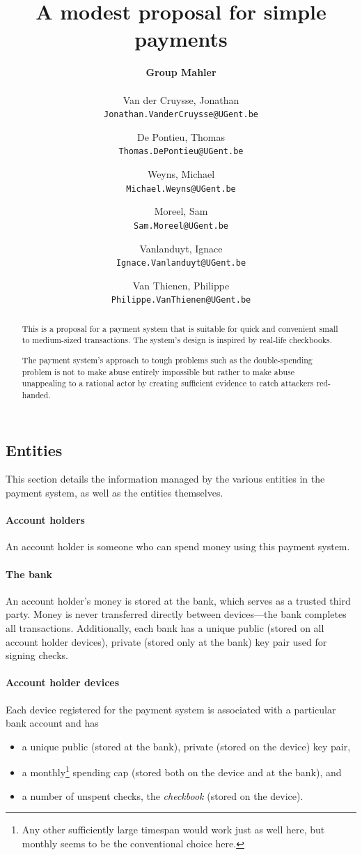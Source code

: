 \documentclass[12pt,a4paper]{article}
\author{
\textbf{Group Mahler}\\~\\
  Van der Cruysse, Jonathan\\ \texttt{Jonathan.VanderCruysse@UGent.be}
  \and
  De Pontieu, Thomas\\ \texttt{Thomas.DePontieu@UGent.be}
  \and
 Weyns, Michael\\ \texttt{Michael.Weyns@UGent.be}
\and
Moreel, Sam\\ \texttt{Sam.Moreel@UGent.be}
\and
Vanlanduyt, Ignace\\ \texttt{Ignace.Vanlanduyt@UGent.be}
\and
Van Thienen, Philippe\\ \texttt{Philippe.VanThienen@UGent.be}
}
\title{A modest proposal for simple payments}
\begin{document}
	\maketitle
	
	\begin{abstract}
		This is a proposal for a payment system that is suitable for quick and convenient small to medium-sized transactions. The system's design is inspired by real-life checkbooks.
		
		The payment system's approach to tough problems such as the double-spending problem is not to make abuse entirely impossible but rather to make abuse unappealing to a rational actor by creating sufficient evidence to catch attackers red-handed.
	\end{abstract}

	\begin{multicols}{2}

	\section{Entities}
	\label{sec:entities}
	
	This section details the information managed by the various entities in the payment system, as well as the entities themselves.
	
	\paragraph{Account holders} An account holder is someone who can spend money using this payment system.
	
	\paragraph{The bank}
	
	An account holder's money is stored at the bank, which serves as a trusted third party. Money is never transferred directly between devices---the bank completes all transactions. Additionally, each bank has a unique public (stored on all account holder devices), private (stored only at the bank) key pair used for signing checks.
	
	\paragraph{Account holder devices}
	
	Each device registered for the payment system is associated with a particular bank account and has
	\begin{itemize}
		\item a unique public (stored at the bank), private (stored on the device) key pair,
		\item a monthly\footnote{Any other sufficiently large timespan would work just as well here, but monthly seems to be the conventional choice here.} spending cap (stored both on the device and at the bank), and
		\item a number of unspent checks, the \emph{checkbook} (stored on the device).
	\end{itemize}


\end{multicols}
\end{document}
